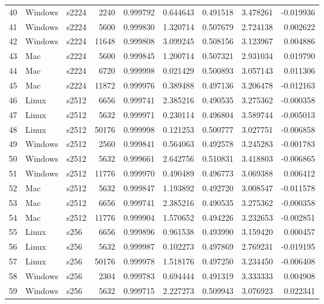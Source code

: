\documentclass{IEEEtran}
\begin{document}
\begin{longtable}{rllrrrrrr}
  40 & Windows & s2224 &    2240 & 0.999792 & 0.644643 & 0.491518 & 3.478261 & -0.019936 \\ 
  41 & Windows & s2224 &    5600 & 0.999830 & 1.320714 & 0.507679 & 2.724138 & 0.002622 \\ 
  42 & Windows & s2224 &   11648 & 0.999808 & 3.099245 & 0.508156 & 3.123967 & 0.004886 \\ 
  43 & Mac & s2224 &    5600 & 0.999845 & 1.200714 & 0.507321 & 2.931034 & 0.019790 \\ 
  44 & Mac & s2224 &    6720 & 0.999998 & 0.021429 & 0.500893 & 3.057143 & 0.011306 \\ 
  45 & Mac & s2224 &   11872 & 0.999976 & 0.389488 & 0.497136 & 3.206478 & -0.012163 \\ 
  46 & Linux & s2512 &    6656 & 0.999741 & 2.385216 & 0.490535 & 3.275362 & -0.000358 \\ 
  47 & Linux & s2512 &    5632 & 0.999971 & 0.230114 & 0.496804 & 3.589744 & -0.005013 \\ 
  48 & Linux & s2512 &   50176 & 0.999998 & 0.121253 & 0.500777 & 3.027751 & -0.006858 \\ 
  49 & Windows & s2512 &    2560 & 0.999841 & 0.564063 & 0.492578 & 3.245283 & -0.001783 \\ 
  50 & Windows & s2512 &    5632 & 0.999661 & 2.642756 & 0.510831 & 3.418803 & -0.006865 \\ 
  51 & Windows & s2512 &   11776 & 0.999970 & 0.490489 & 0.496773 & 3.069388 & 0.006412 \\ 
  52 & Mac & s2512 &    5632 & 0.999847 & 1.193892 & 0.492720 & 3.008547 & -0.011578 \\ 
  53 & Mac & s2512 &    6656 & 0.999741 & 2.385216 & 0.490535 & 3.275362 & -0.000358 \\ 
  54 & Mac & s2512 &   11776 & 0.999904 & 1.570652 & 0.494226 & 3.232653 & -0.002851 \\ 
  55 & Linux & s256 &    6656 & 0.999896 & 0.961538 & 0.493990 & 3.159420 & 0.000457 \\ 
  56 & Linux & s256 &    5632 & 0.999987 & 0.102273 & 0.497869 & 2.769231 & -0.019195 \\ 
  57 & Linux & s256 &   50176 & 0.999978 & 1.518176 & 0.497250 & 3.234450 & -0.006408 \\ 
  58 & Windows & s256 &    2304 & 0.999783 & 0.694444 & 0.491319 & 3.333333 & 0.004908 \\ 
  59 & Windows & s256 &    5632 & 0.999715 & 2.227273 & 0.509943 & 3.076923 & 0.022341 \\ 

\end{longtable}
\end{document}
